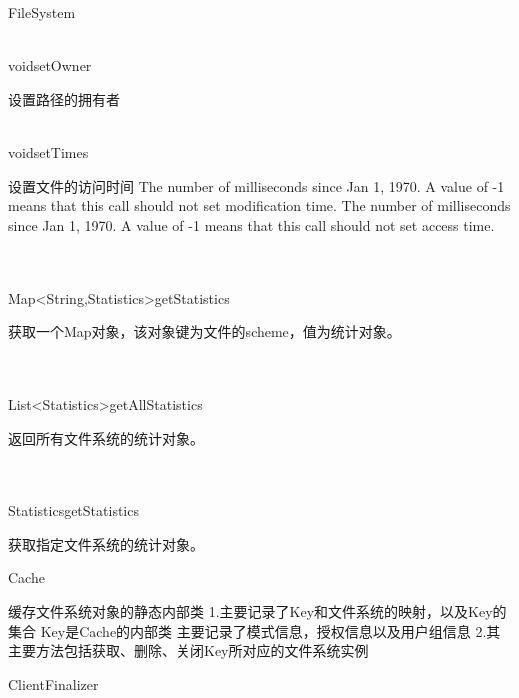 \begin{XeClass}{FileSystem}
  \begin{XeMethod}{\XePublic\\ }{void}{setOwner}
       
 设置路径的拥有者

  \end{XeMethod}

  \begin{XeMethod}{\XePublic\\ }{void}{setTimes}
       
 设置文件的访问时间
 The number of milliseconds since Jan 1, 1970.
 A value of -1 means that this call should not set modification time.
 The number of milliseconds since Jan 1, 1970.
 A value of -1 means that this call should not set access time.

  \end{XeMethod}

  \begin{XeMethod}{\XePublic\\ \XeSync\\ }{Map<String,Statistics>}{getStatistics}
       
 获取一个Map对象，该对象键为文件的scheme，值为统计对象。

  \end{XeMethod}

  \begin{XeMethod}{\XePublic\\ \XeSync\\ }{List<Statistics>}{getAllStatistics}
       
 返回所有文件系统的统计对象。

  \end{XeMethod}

  \begin{XeMethod}{\XePublic\\ \XeSync\\ }{Statistics}{getStatistics}
       
 获取指定文件系统的统计对象。

  \end{XeMethod}

  \begin{XeInnerClass}{Cache}
     
 缓存文件系统对象的静态内部类
 1.主要记录了Key和文件系统的映射，以及Key的集合
 Key是Cache的内部类
 主要记录了模式信息，授权信息以及用户组信息
 2.其主要方法包括获取、删除、关闭Key所对应的文件系统实例

    \begin{XeInnerClass}{ClientFinalizer}
       

\end{XeInnerClass}
\end{XeInnerClass}
\end{XeClass}
